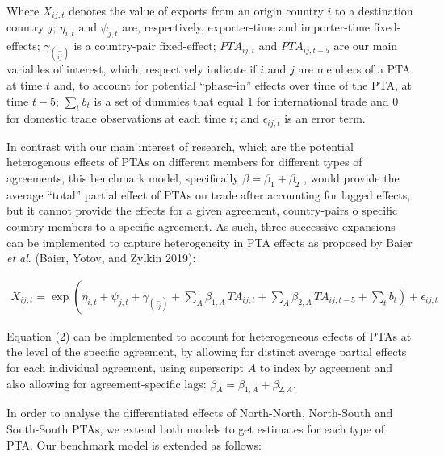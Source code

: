 Where \(X_{ij,t}\) denotes the value of exports from an origin country
\(i\) to a destination country \(j\); \(\eta_{i,t}\) and \(\psi_{j,t}\)
are, respectively, exporter-time and importer-time fixed-effects;
\(\gamma_{\binom{-}{ij}}\) is a country-pair fixed-effect;
\({PTA}_{ij,t}\) and \({PTA}_{ij,t - 5}\) are our main variables of
interest, which, respectively indicate if \(i\) and \(j\) are members of
a PTA at time \(t\) and, to account for potential ``phase-in'' effects
over time of the PTA, at time \(t - 5\); \(\sum_{t}^{}b_{t}\) is a set
of dummies that equal 1 for international trade and 0 for domestic trade
observations at each time \(t\); and \(\epsilon_{ij,t}\) is an error
term.

In contrast with our main interest of research, which are the potential
heterogenous effects of PTAs on different members for different types of
agreements, this benchmark model, specifically
\(\beta = \beta_{1} + \beta_{2}\) , would provide the average ``total''
partial effect of PTAs on trade after accounting for lagged effects, but
it cannot provide the effects for a given agreement, country-pairs o
specific country members to a specific agreement. As such, three
successive expansions can be implemented to capture heterogeneity in PTA
effects as proposed by Baier \emph{et al}. (Baier, Yotov, and Zylkin
2019):

\begin{multline}
    X_{ij,t} = \exp\left(\eta_{i,t} + \psi_{j,t} + \gamma_{\binom{-}{ij}} + \sum_{A} \beta_{1,A} \, TA_{ij,t} \right. + \sum_{A} \beta_{2,A} \, TA_{ij,t-5} + \left. \sum_{t} b_{t} \right) + \epsilon_{ij,t}
\end{multline}

Equation (2) can be implemented to account for heterogeneous effects of
PTAs at the level of the specific agreement, by allowing for distinct
average partial effects for each individual agreement, using superscript
\(A\) to index by agreement and also allowing for agreement-specific
lags: \(\beta_{A} = \beta_{1,A} + \beta_{2,A}\).

In order to analyse the differentiated effects of North-North,
North-South and South-South PTAs, we extend both models to get estimates
for each type of PTA. Our benchmark model is extended as follows:

